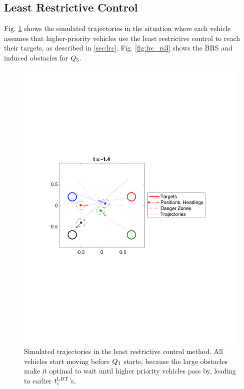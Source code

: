 \subsection{Least Restrictive Control}
Fig. \ref{fig:lrc_traj} shows the simulated trajectories in the situation where each vehicle assumes that higher-priority vehicles use the least restrictive control to reach their targets, as described in \ref{sec:lrc}. Fig. \ref{fig:lrc_rs3} shows the BRS and induced obstacles for $Q_3$.

\begin{figure}[H]
  \centering
  \includegraphics[width=\columnwidth]{"fig/lrc_traj"}
  \caption{Simulated trajectories in the least restrictive control method. All vehicles start moving before $Q_1$ starts, because the large obstacles make it optimal to wait until higher priority vehicles pass by, leading to earlier $t^\text{LDT}_i$'s. }
  \label{fig:lrc_traj}
\end{figure}

